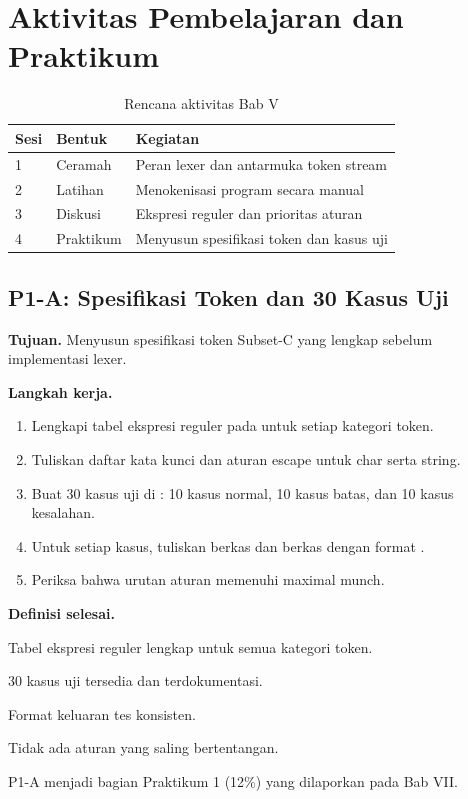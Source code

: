 \section*{Aktivitas Pembelajaran dan Praktikum}

\begin{table}[H]
\centering
\caption{Rencana aktivitas Bab V}
\label{tab:ch05-aktivitas}
\begin{tabularx}{\textwidth}{@{}llX@{}}
\toprule
\textbf{Sesi} & \textbf{Bentuk} & \textbf{Kegiatan} \\
\midrule
1 & Ceramah & Peran lexer dan antarmuka token stream \\
2 & Latihan & Menokenisasi program secara manual \\
3 & Diskusi & Ekspresi reguler dan prioritas aturan \\
4 & Praktikum & Menyusun spesifikasi token dan kasus uji \\
\bottomrule
\end{tabularx}
\end{table}

\subsection*{P1-A: Spesifikasi Token dan 30 Kasus Uji}
\textbf{Tujuan.} Menyusun spesifikasi token Subset-C yang lengkap
sebelum implementasi lexer.

\textbf{Langkah kerja.}
\begin{enumerate}[label=\arabic*.,leftmargin=*]
  \item Lengkapi tabel ekspresi reguler pada
         untuk setiap kategori token.
  \item Tuliskan daftar kata kunci dan aturan escape untuk char serta
        string.
  \item Buat 30 kasus uji di : 10 kasus normal,
        10 kasus batas, dan 10 kasus kesalahan.
  \item Untuk setiap kasus, tuliskan berkas  dan berkas
         dengan format .
  \item Periksa bahwa urutan aturan memenuhi maximal munch.
\end{enumerate}

\textbf{Definisi selesai.}
\begin{checklist}
  \item Tabel ekspresi reguler lengkap untuk semua kategori token.
  \item 30 kasus uji tersedia dan terdokumentasi.
  \item Format keluaran tes konsisten.
  \item Tidak ada aturan yang saling bertentangan.
\end{checklist}

P1-A menjadi bagian Praktikum 1 (12\%) yang dilaporkan pada Bab VII.
